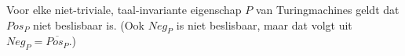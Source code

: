   Voor elke niet-triviale, taal-invariante eigenschap $P$ van Turingmachines geldt dat $Pos_P$ niet beslisbaar is. (Ook $Neg_P$ is niet beslisbaar, maar dat volgt uit $Neg_P = \overline{Pos_P}$.)